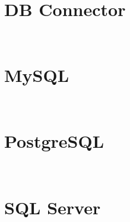 \begin{lstlisting}[language=PHP]

\end{lstlisting}


\chapter{DB Connector}

\begin{lstlisting}[language=PHP]

\end{lstlisting}



\begin{lstlisting}[language=PHP]

\end{lstlisting}


\chapter{MySQL}

\begin{lstlisting}[language=PHP]

\end{lstlisting}



\begin{lstlisting}[language=PHP]

\end{lstlisting}


\chapter{PostgreSQL}

\begin{lstlisting}[language=PHP]

\end{lstlisting}



\begin{lstlisting}[language=PHP]

\end{lstlisting}

\chapter{SQL Server}

\begin{lstlisting}[language=PHP]

\end{lstlisting}



